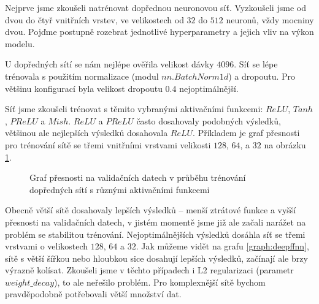 Nejprve jsme zkoušeli natrénovat dopřednou neuronovou síť. Vyzkoušeli jsme od
dvou do čtyř vnitřních vrstev, ve velikostech od $32$ do $512$ neuronů, vždy
mocniny dvou. Pojďme postupně rozebrat jednotlivé hyperparametry a jejich vliv
na výkon modelu.

U dopředných sítí se nám nejlépe ověřila velikost dávky $4096$. Síť se lépe
trénovala s použitím normalizace (modul $nn.BatchNorm1d$) a dropoutu. Pro
většinu konfigurací byla velikost dropoutu $0.4$ nejoptimálnější.

Síť jsme zkoušeli trénovat s těmito vybranými aktivačními funkcemi: $ReLU$,
$Tanh$, $PReLU$ a $Mish$. $ReLU$ a $PReLU$ často dosahovaly podobných výsledků,
většinou ale nejlepších výsledků dosahovala $ReLU$. Příkladem je graf přesnosti
pro trénování sítě se třemi vnitřními vrstvami velikosti $128$, $64$, a $32$ na
obrázku \ref{graph:fnnactivations}.

\begin{figure}[]
    \centering
    \caption{Graf přesnosti na validačních datech v průběhu trénování dopředných sítí s různými aktivačními funkcemi}
    \label{graph:fnnactivations}
\end{figure}

Obecně větší sítě dosahovaly lepších výsledků – menší ztrátové funkce a vyšší
přesnosti na validačních datech, v jistém momentě jsme již ale začali narážet
na problém se stabilitou trénování. Nejoptimálnějších výsledků dosáhla síť se
třemi vrstvami o velikostech $128$, $64$ a $32$. Jak můžeme vidět na grafu
\ref{graph:deepffnn}, sítě s větší šířkou nebo hloubkou sice dosahují lepších
výsledků, začínají ale brzy výrazně kolísat. Zkoušeli jsme v těchto případech i
L2 regularizaci (parametr $weight\_decay$), to ale neřešilo problém. Pro
komplexnější sítě bychom pravděpodobně potřebovali větší množství dat.

